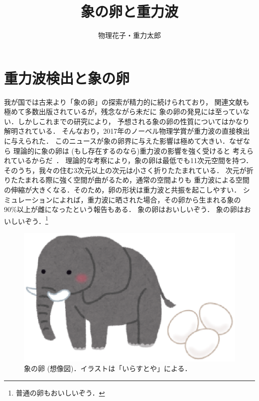 \documentclass[b5paper,papersize,twocolumn]{jsarticle}
\title{象の卵と重力波}
\author{物理花子・重力太郎}
\begin{document}
\maketitle

\section{重力波検出と象の卵}

我が国では古来より「象の卵」の探索が精力的に続けられており，
関連文献も極めて多数出版されているが，残念ながら未だに
象の卵の発見には至っていない．しかしこれまでの研究により，
予想される象の卵の性質についてはかなり解明されている．
そんなおり，2017年のノーベル物理学賞が重力波の直接検出に与えられた．
このニュースが象の卵界に与えた影響は極めて大きい．なぜなら
理論的に象の卵は (もし存在するのなら)重力波の影響を強く受けると
考えられているからだ~\cite{elephant}．
理論的な考察により，象の卵は最低でも11次元空間を持つ．
そのうち，我々の住む3次元以上の次元は小さく折りたたまれている．
次元が折りたたまれる際に強く空間が曲がるため，通常の空間よりも
重力波による空間の伸縮が大きくなる．そのため，卵の形状は重力波と共振を起こしやすい．
シミュレーションによれば，重力波に晒された場合，その卵から生まれる象の
90\%以上が雌になったという報告もある．
象の卵はおいしいぞう．
象の卵はおいしいぞう．\footnote{%
普通の卵もおいしいぞう．
}

\begin{figure}[tb]
\centering
\includegraphics[width=\linewidth]{eggphant.eps}
\caption{象の卵 (想像図)．イラストは「いらすとや」による．}
\label{fig_eggphant}
\end{figure}
\end{document}
